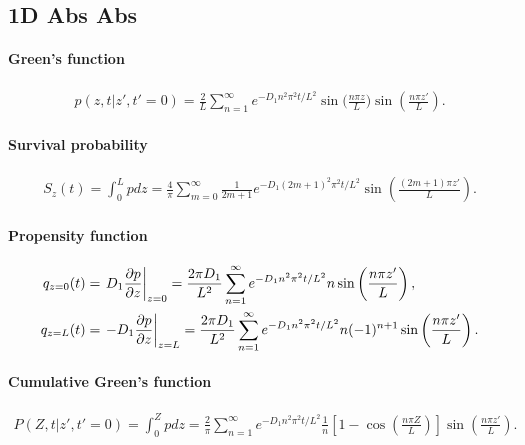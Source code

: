 
\subsection{1D Abs Abs}

\paragraph{Green's function}
\begin{align}
  p(z,t|z',t'=0) = \frac{2}{L}\sum_{n=1}^{\infty}
  e^{-D_1n^2\pi^2t/L^2} \sin\bigg(\frac{n\pi z}{L}\bigg) \sin\left(\frac{n\pi z'}{L}\right).
\end{align}

\paragraph{Survival probability}
\begin{align}
  S_z(t) = \int_0^L p dz = \frac{4}{\pi} \sum_{m=0}^{\infty} \frac{1}{2m+1}
  e^{-D_1(2m+1)^2\pi^2t/L^2} \sin\left(\frac{(2m+1)\pi z'}{L}\right).
\end{align}

\paragraph{Propensity function}
\begin{align}
  q_{z=0}(t) &= \left.D_1 \frac{\partial p}{\partial z}\right|_{z=0} = \frac{2\pi D_1}{L^2} 
  \sum_{n=1}^{\infty} e^{-D_1n^2\pi^2t/L^2} n \sin\left(\frac{n\pi z'}{L}\right),\\
  q_{z=L}(t) &= \left.- D_1 \frac{\partial p}{\partial z}\right|_{z=L} = \frac{2\pi D_1}{L^2} 
  \sum_{n=1}^{\infty} e^{-D_1n^2\pi^2t/L^2} n (-1)^{n+1} \sin\left(\frac{n\pi z'}{L}\right).
\end{align}

\paragraph{Cumulative Green's function}
\begin{align}
  P(Z,t|z',t'=0) = \int_0^Z p dz =
  \frac{2}{\pi} \sum_{n=1}^{\infty} e^{-D_1n^2\pi^2 t/L^2}
      \frac{1}{n} \left[ 1 - \cos\left(\frac{n\pi Z}{L}\right) \right] \sin\left(\frac{n\pi z'}{L}\right).
\end{align}